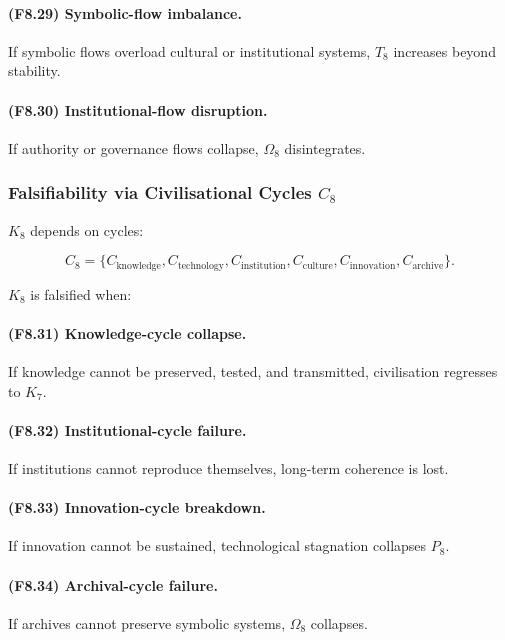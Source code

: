 \paragraph{(F8.29) Symbolic-flow imbalance.}
If symbolic flows overload cultural or institutional systems,
$T_8$ increases beyond stability.

\paragraph{(F8.30) Institutional-flow disruption.}
If authority or governance flows collapse,
$\Omega_8$ disintegrates.



\subsubsection{Falsifiability via Civilisational Cycles \texorpdfstring{$C_8$}{C_8}}

$K_8$ depends on cycles:

\[
C_8 = \{
C_{\mathrm{knowledge}},
C_{\mathrm{technology}},
C_{\mathrm{institution}},
C_{\mathrm{culture}},
C_{\mathrm{innovation}},
C_{\mathrm{archive}}
\}.
\]

$K_8$ is falsified when:

\paragraph{(F8.31) Knowledge-cycle collapse.}
If knowledge cannot be preserved, tested, and transmitted,  
civilisation regresses to $K_7$.

\paragraph{(F8.32) Institutional-cycle failure.}
If institutions cannot reproduce themselves,
long-term coherence is lost.

\paragraph{(F8.33) Innovation-cycle breakdown.}
If innovation cannot be sustained,
technological stagnation collapses $P_8$.

\paragraph{(F8.34) Archival-cycle failure.}
If archives cannot preserve symbolic systems,
$\Omega_8$ collapses.

